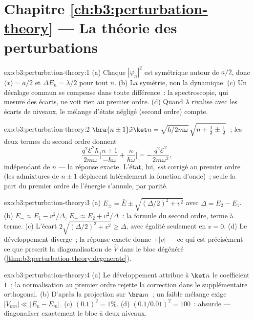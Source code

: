 \section*{Chapitre \ref{ch:b3:perturbation-theory} --- La théorie des perturbations}

\begin{solution}{exo:b3:perturbation-theory:1}
(a) Chaque $|\varphi_n|^2$ est symétrique autour de $a/2$, donc $\langle
x\rangle = a/2$ et $\Delta E_n = \lambda/2$ pour tout $n$. (b) La
symétrie, non la dynamique. (c) Un décalage commun se compense dans
toute différence~: la spectroscopie, qui mesure des écarts, ne voit
rien au premier ordre. (d) Quand $\lambda$ rivalise avec les écarts de
niveaux, le mélange d'états négligé (second ordre) compte.
\end{solution}

\begin{solution}{exo:b3:perturbation-theory:2}
$\bra{n\pm1}\hat x\ket n = \sqrt{\hbar/2m\omega}\,\sqrt{n + \tfrac12
\pm \tfrac12}$~; les deux termes du second ordre donnent
\[
\frac{q^2\mathcal E^2\hbar}{2m\omega}\Big[\frac{n+1}{-\hbar\omega}
+ \frac{n}{\hbar\omega}\Big] = -\frac{q^2\mathcal E^2}{2m\omega^2} ,
\]
indépendant de $n$ --- la réponse exacte. L'état, lui, \emph{est}
corrigé au premier ordre (les admixtures de $n \pm 1$ déplacent
latéralement la fonction d'onde)~; seule la part du premier ordre de
l'énergie s'annule, par parité.
\end{solution}

\begin{solution}{exo:b3:perturbation-theory:3}
(a) $E_\pm = \bar E \pm \sqrt{(\Delta/2)^2 + v^2}$ avec $\Delta =
E_2 - E_1$. (b) $E_- \approx E_1 - v^2/\Delta$, $E_+ \approx E_2 +
v^2/\Delta$~: la formule du second ordre, terme à terme. (c) L'écart
$2\sqrt{(\Delta/2)^2 + v^2} \ge \Delta$, avec égalité seulement en $v =
0$. (d) Le développement diverge~; la réponse exacte donne $\pm|v|$ ---
ce qui est précisément ce que prescrit la diagonalisation de $\hat V$
dans le bloc dégénéré
(\cref{thm:b3:perturbation-theory:degenerate}).
\end{solution}

\begin{solution}{exo:b3:perturbation-theory:4}
(a) Le développement attribue à $\ket n$ le coefficient $1$~; la
normalisation au premier ordre rejette la correction dans le
supplémentaire orthogonal. (b) D'après la projection sur $\bra m$~; un
faible mélange exige $|V_{mn}| \ll |E_n - E_m|$. (c) $(0.1)^2 = 1\%$. (d)
$(0.1/0.01)^2 = 100$~: absurde --- diagonaliser exactement le bloc à
deux niveaux.
\end{solution}

